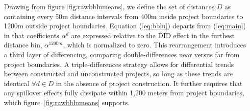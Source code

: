 \documentclass[12pt]{article}
\begin{document}
\noindent Drawing from figure \ref{fig:rawbblumeans}, we define the set of distances $D$ as containing every 50m distance intervals from 400m inside project boundaries to 1200m outside project boundaries. Equation (\ref{eq:bblu}) departs from (\ref{eq:main}) in that coefficients $\alpha^d$ are expressed relative to the DID effect in the furthest distance bin, $\alpha^{1200m}$, which is normalized to zero. This rearrangement introduces  a third layer of differencing, comparing double-differences near versus far from project boundaries. A triple-differences strategy allows for differential trends between constructed and unconstructed projects, so long as these trends are identical $\forall d\in D$ in the absence of project construction. It further requires that any spillover effects fully dissipate within 1,200 meters from project boundaries, which figure~\ref{fig:rawbblumeans} supports.
\end{document}

